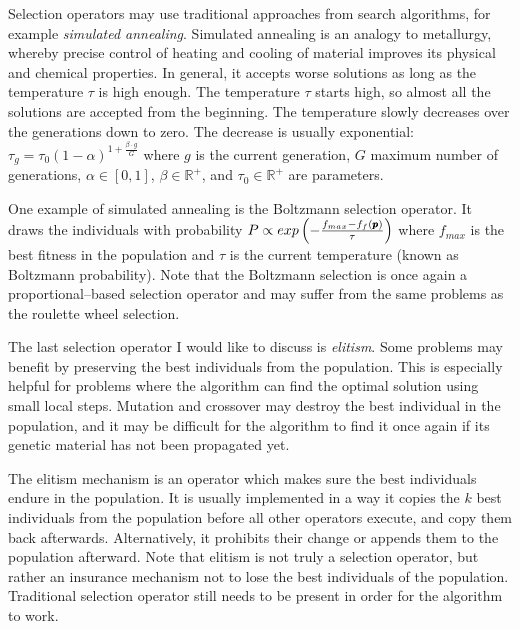 Selection operators may use traditional approaches from search algorithms, for example \emph{simulated annealing}. Simulated annealing is an analogy to metallurgy, whereby precise control of heating and cooling of material improves its physical and chemical properties. In general, it accepts worse solutions as long as the temperature $\tau$ is high enough. The temperature $\tau$ starts high, so almost all the solutions are accepted from the beginning. The temperature slowly decreases over the generations down to zero. The decrease is usually exponential: $\tau_g=\tau_0(1-\alpha)^{1+\frac{\beta\cdot g}{G}}$ where $g$ is the current generation, $G$ maximum number of generations, $\alpha\in\left[0,1\right]$, $\beta\in\mathbb{R}^+$, and $\tau_0\in\mathbb{R}^+$ are parameters. 

One example of simulated annealing is the Boltzmann selection operator. It draws the individuals with probability 
$P\propto exp\left(-\frac{f_{max} - f_f(\pmb{p})}{\tau}\right)$
where $f_{max}$ is the best fitness in the population and $\tau$ is the current temperature (known as Boltzmann probability). Note that the Boltzmann selection is once again a proportional--based selection operator and may suffer from the same problems as the roulette wheel selection.

The last selection operator I would like to discuss is \emph{elitism}. Some problems may benefit by preserving the best individuals from the population. This is especially helpful for problems where the algorithm can find the optimal solution using small local steps. Mutation and crossover may destroy the best individual in the population, and it may be difficult for the algorithm to find it once again if its genetic material has not been propagated yet.

The elitism mechanism is an operator which makes sure the best individuals endure in the population. It is usually implemented in a way it copies the $k$ best individuals from the population before all other operators execute, and copy them back afterwards. Alternatively, it prohibits their change or appends them to the population afterward. Note that elitism is not truly a selection operator, but rather an insurance mechanism not to lose the best individuals of the population. Traditional selection operator still needs to be present in order for the algorithm to work. 




